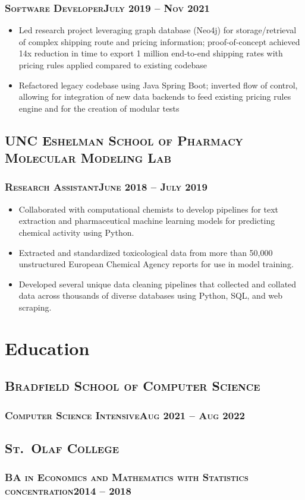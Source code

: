 \documentclass{article}
\newcommand{\resumeSection}[1]{\section*{#1}}
\newcommand{\institution}[1]{\subsection*{\scshape{#1}}}
\newcommand{\jobPosition}[3]{\subsubsection*{\scshape{#1}\hfill #2 -- #3}}
\begin{document}
    \jobPosition{Software Developer}{July 2019}{Nov 2021}
    \begin{itemize}[noitemsep]
      \item
            Led research project leveraging graph database (Neo4j) for
            storage/retrieval of complex shipping route and pricing information;
            proof-of-concept achieved 14x reduction in time to export 1 million
            end-to-end shipping rates with pricing rules applied compared to
            existing codebase
      \item
            Refactored legacy codebase using Java Spring Boot; inverted
            flow of control, allowing for integration of new data backends
            to feed existing pricing rules engine and for the creation of modular
            tests
    \end{itemize}

  \institution{UNC Eshelman School of Pharmacy Molecular Modeling Lab}

    \jobPosition{Research Assistant}{June 2018}{July 2019}
    \begin{itemize}[noitemsep]
      \item
            Collaborated with computational chemists to develop
            pipelines for text extraction and pharmaceutical machine
            learning models for predicting chemical activity using Python.
      \item
            Extracted and standardized toxicological data from more
            than 50,000 unstructured European Chemical Agency reports
            for use in model training.
      \item
            Developed several unique data cleaning pipelines that
            collected and collated data across thousands of diverse
            databases using Python, SQL, and web scraping.
    \end{itemize}

\resumeSection{Education}
  \institution{Bradfield School of Computer Science}
    \jobPosition{Computer Science Intensive}{Aug 2021}{Aug 2022}


  \institution{St.\ Olaf College}
    \jobPosition{BA in Economics and Mathematics with Statistics concentration}{2014}{2018}
\end{document}
